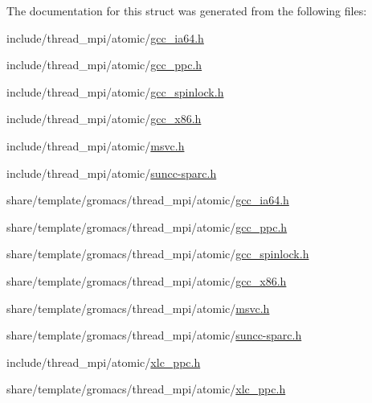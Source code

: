 \-The documentation for this struct was generated from the following files\-:\begin{DoxyCompactItemize}
\item 
include/thread\-\_\-mpi/atomic/\hyperlink{include_2thread__mpi_2atomic_2gcc__ia64_8h}{gcc\-\_\-ia64.\-h}\item 
include/thread\-\_\-mpi/atomic/\hyperlink{include_2thread__mpi_2atomic_2gcc__ppc_8h}{gcc\-\_\-ppc.\-h}\item 
include/thread\-\_\-mpi/atomic/\hyperlink{include_2thread__mpi_2atomic_2gcc__spinlock_8h}{gcc\-\_\-spinlock.\-h}\item 
include/thread\-\_\-mpi/atomic/\hyperlink{include_2thread__mpi_2atomic_2gcc__x86_8h}{gcc\-\_\-x86.\-h}\item 
include/thread\-\_\-mpi/atomic/\hyperlink{include_2thread__mpi_2atomic_2msvc_8h}{msvc.\-h}\item 
include/thread\-\_\-mpi/atomic/\hyperlink{include_2thread__mpi_2atomic_2suncc-sparc_8h}{suncc-\/sparc.\-h}\item 
share/template/gromacs/thread\-\_\-mpi/atomic/\hyperlink{share_2template_2gromacs_2thread__mpi_2atomic_2gcc__ia64_8h}{gcc\-\_\-ia64.\-h}\item 
share/template/gromacs/thread\-\_\-mpi/atomic/\hyperlink{share_2template_2gromacs_2thread__mpi_2atomic_2gcc__ppc_8h}{gcc\-\_\-ppc.\-h}\item 
share/template/gromacs/thread\-\_\-mpi/atomic/\hyperlink{share_2template_2gromacs_2thread__mpi_2atomic_2gcc__spinlock_8h}{gcc\-\_\-spinlock.\-h}\item 
share/template/gromacs/thread\-\_\-mpi/atomic/\hyperlink{share_2template_2gromacs_2thread__mpi_2atomic_2gcc__x86_8h}{gcc\-\_\-x86.\-h}\item 
share/template/gromacs/thread\-\_\-mpi/atomic/\hyperlink{share_2template_2gromacs_2thread__mpi_2atomic_2msvc_8h}{msvc.\-h}\item 
share/template/gromacs/thread\-\_\-mpi/atomic/\hyperlink{share_2template_2gromacs_2thread__mpi_2atomic_2suncc-sparc_8h}{suncc-\/sparc.\-h}\item 
include/thread\-\_\-mpi/atomic/\hyperlink{include_2thread__mpi_2atomic_2xlc__ppc_8h}{xlc\-\_\-ppc.\-h}\item 
share/template/gromacs/thread\-\_\-mpi/atomic/\hyperlink{share_2template_2gromacs_2thread__mpi_2atomic_2xlc__ppc_8h}{xlc\-\_\-ppc.\-h}\end{DoxyCompactItemize}
